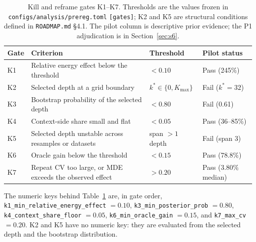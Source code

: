 \documentclass[a4paper,fleqn]{cas-sc}
\begin{document}
\begin{table}[pos=htbp]
  \centering
  \caption{Kill and reframe gates K1--K7. Thresholds are the values frozen in
  \texttt{configs/analysis/prereg.toml} \texttt{[gates]}; K2 and K5 are structural conditions
  defined in \texttt{ROADMAP.md} \S4.1. The pilot column is descriptive prior evidence; the P1
  adjudication is in Section~\ref{sec:s6}.}
  \label{tab:kgates}
  \small
  \begin{tabularx}{\textwidth}{>{\raggedright\arraybackslash}p{0.9cm}>{\raggedright\arraybackslash}p{6.3cm}>{\raggedright\arraybackslash}p{3.0cm}>{\raggedright\arraybackslash}X}
    \toprule
    \textbf{Gate} & \textbf{Criterion} & \textbf{Threshold} & \textbf{Pilot status} \\
    \midrule
    K1 & Relative energy effect below the threshold & $<0.10$ & Pass (245\%) \\
    K2 & Selected depth at a grid boundary & $k^{*}\in\{0,K_{\max}\}$ & Fail ($k^{*}=32$) \\
    K3 & Bootstrap probability of the selected depth & $<0.80$ & Fail (0.61) \\
    K4 & Context-side share small and flat & $<0.05$ & Pass (36--85\%) \\
    K5 & Selected depth unstable across resamples or datasets & span $>1$ depth & Fail (span 3) \\
    K6 & Oracle gain below the threshold & $<0.15$ & Pass (78.8\%) \\
    K7 & Repeat CV too large, or MDE exceeds the observed effect & $>0.20$ & Pass (3.80\% median) \\
    \bottomrule
  \end{tabularx}
\end{table}

The numeric keys behind Table~\ref{tab:kgates} are, in gate order,
\texttt{k1\_min\_relative\_energy\_effect} $=0.10$,
\texttt{k3\_min\_posterior\_prob} $=0.80$,
\texttt{k4\_context\_share\_floor} $=0.05$,
\texttt{k6\_min\_oracle\_gain} $=0.15$, and
\texttt{k7\_max\_cv} $=0.20$. K2 and K5 have no numeric key: they are evaluated from the
selected depth and the bootstrap distribution.
\end{document}
